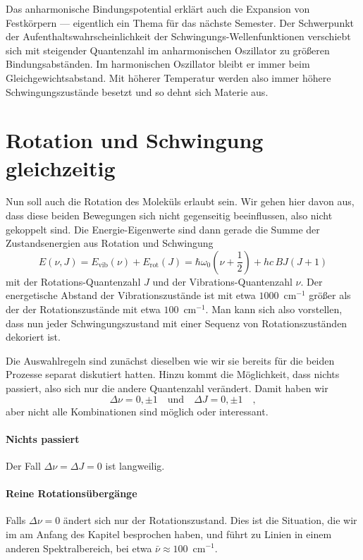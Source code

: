 Das anharmonische Bindungspotential erklärt auch die Expansion von Festkörpern --- eigentlich ein Thema für das nächste Semester. Der Schwerpunkt der Aufenthaltswahrscheinlichkeit der Schwingungs-Wellenfunktionen verschiebt sich mit steigender Quantenzahl im anharmonischen Oszillator zu größeren Bindungsabständen. Im harmonischen Oszillator bleibt er immer beim Gleichgewichtsabstand. Mit höherer Temperatur werden also immer höhere Schwingungszustände besetzt und so dehnt sich Materie aus.


\section{Rotation und Schwingung gleichzeitig}

Nun soll auch die Rotation des Moleküls erlaubt sein. Wir gehen hier davon aus, dass diese beiden Bewegungen sich nicht gegenseitig beeinflussen, also nicht gekoppelt sind. Die Energie-Eigenwerte sind dann gerade die Summe der Zustandsenergien aus Rotation und Schwingung%
\begin{equation}
E (\nu, J) = E_\text{vib}(\nu) + E_\text{rot}(J) = \hbar \omega_0 \left(\nu + \frac{1}{2} \right) + h c \, B J \left( J+1 \right) \label{eq:vib_rot_simple}
\end{equation}
mit der Rotations-Quantenzahl $J$ und der Vibrations-Quantenzahl $\nu$. Der energetische Abstand der Vibrationszustände ist mit etwa $1000$~cm$^{-1}$  größer als der der Rotationszustände mit etwa $100$~cm$^{-1}$. Man kann sich also vorstellen, dass nun jeder Schwingungszustand mit einer Sequenz von Rotationszuständen dekoriert ist.

Die Auswahlregeln sind zunächst dieselben wie wir sie bereits für die beiden Prozesse separat diskutiert hatten. Hinzu kommt die Möglichkeit, dass nichts passiert, also sich nur die andere Quantenzahl verändert. Damit haben wir
\begin{equation}
 \Delta \nu = 0, \pm 1 \quad \text{und} \quad \Delta J = 0, \pm 1  \quad ,
\end{equation}
aber nicht alle Kombinationen sind möglich oder interessant.

\paragraph{Nichts passiert} Der Fall $\Delta \nu = \Delta J = 0$ ist langweilig.

\paragraph{Reine Rotationsübergänge} Falls $\Delta \nu = 0$ ändert sich nur der Rotationszustand. Dies ist die Situation, die wir im am Anfang des Kapitel besprochen haben, und führt zu Linien  in einem anderen Spektralbereich, bei etwa $\bar{\nu} \approx 100$~cm$^{-1}$.

